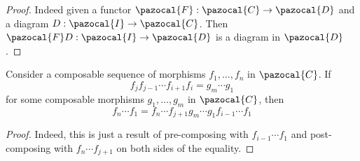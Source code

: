     \begin{proof}
        Indeed given a functor $\pazocal{F} : \pazocal{C}\rightarrow \pazocal{D}$ and a diagram $D : \pazocal{I} \rightarrow \pazocal{C}$. Then $\pazocal{F}D : \pazocal{I}\rightarrow \pazocal{D}$ is a diagram in $\pazocal{D}$.
    \end{proof}
    \begin{lemma}
        Consider a composable sequence of morphisms $f_1,\dots,f_n$ in $\pazocal{C}$. If 
        $$
            f_jf_{j-1}\cdots f_{i+1}f_i = g_m\cdots g_1
        $$
        for some composable morphisms $g_1,\dots,g_m$ in $\pazocal{C}$, then 
        $$
            f_n \cdots f_1 = f_n\cdots f_{j+1} g_m\cdots g_1 f_{i-1}\cdots f_1
        $$
    \end{lemma}
    \begin{proof}
        Indeed, this is just a result of pre-composing with $f_{i-1}\cdots f_1$ and post-composing with $f_n\cdots f_{j+1}$ on both sides of the equality. 
    \end{proof}
   
